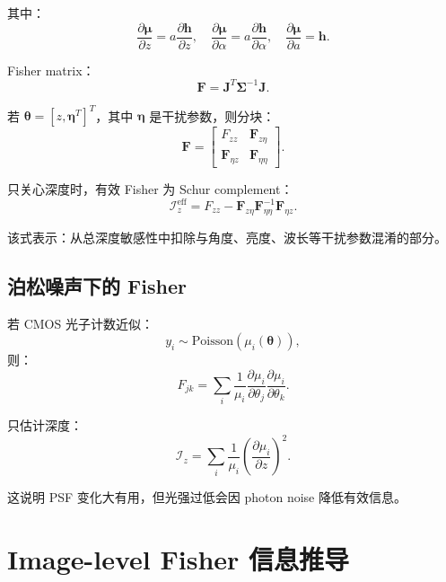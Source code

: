 \documentclass[11pt,a4paper,fontset=none]{ctexart}
\begin{document}
其中：
\begin{equation}
  \frac{\partial\bm\mu}{\partial z}
  =
  a\frac{\partial\bm h}{\partial z},\quad
  \frac{\partial\bm\mu}{\partial\alpha}
  =
  a\frac{\partial\bm h}{\partial\alpha},\quad
  \frac{\partial\bm\mu}{\partial a}
  =
  \bm h.
\end{equation}

Fisher matrix：
\begin{equation}
  \bm F=\bm J^T\bm\Sigma^{-1}\bm J.
\end{equation}

若 $\bm\theta=[z,\bm\eta^T]^T$，其中 $\bm\eta$ 是干扰参数，则分块：
\begin{equation}
  \bm F=
  \begin{bmatrix}
  F_{zz}&\bm F_{z\eta}\\
  \bm F_{\eta z}&\bm F_{\eta\eta}
  \end{bmatrix}.
\end{equation}

只关心深度时，有效 Fisher 为 Schur complement：
\begin{equation}
\boxed{
  \mathcal I_z^{\mathrm{eff}}
  =
  F_{zz}
  -
  \bm F_{z\eta}
  \bm F_{\eta\eta}^{-1}
  \bm F_{\eta z}.
}
\end{equation}

该式表示：从总深度敏感性中扣除与角度、亮度、波长等干扰参数混淆的部分。

\subsection{泊松噪声下的 Fisher}

若 CMOS 光子计数近似：
\begin{equation}
  y_i\sim\mathrm{Poisson}(\mu_i(\bm\theta)),
\end{equation}
则：
\begin{equation}
\boxed{
  F_{jk}
  =
  \sum_i
  \frac{1}{\mu_i}
  \frac{\partial\mu_i}{\partial\theta_j}
  \frac{\partial\mu_i}{\partial\theta_k}.
}
\end{equation}

只估计深度：
\begin{equation}
\boxed{
  \mathcal I_z
  =
  \sum_i
  \frac{1}{\mu_i}
  \left(
  \frac{\partial\mu_i}{\partial z}
  \right)^2 .
}
\end{equation}

这说明 PSF 变化大有用，但光强过低会因 photon noise 降低有效信息。

\section{Image-level Fisher 信息推导}
\end{document}
